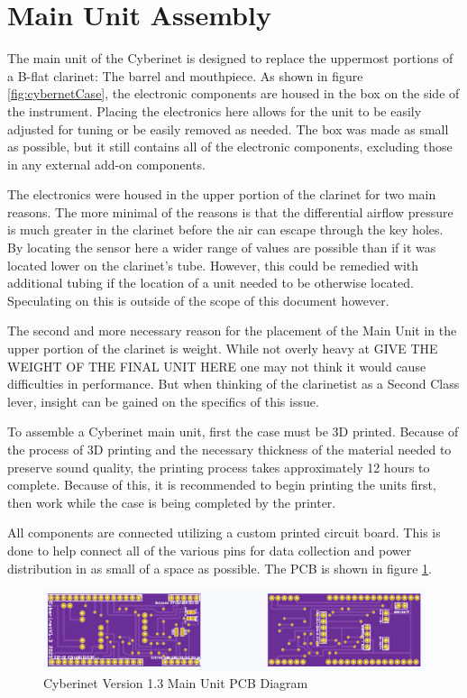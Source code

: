 \section{Main Unit Assembly}

The main unit of the Cyberinet is designed to replace the uppermost portions of a B-flat clarinet: The barrel and mouthpiece. As shown in figure \ref{fig:cybernetCase}, the electronic components are housed in the box on the side of the instrument. Placing the electronics here allows for the unit to be easily adjusted for tuning or be easily removed as needed. The box was made as small as possible, but it still contains all of the electronic components, excluding those in any external add-on components. 

The electronics were housed in the upper portion of the clarinet for two main reasons. The more minimal of the reasons is that the differential airflow pressure is much greater in the clarinet before the air can escape through the key holes. By locating the sensor here a wider range of values are possible than if it was located lower on the clarinet's tube. However, this could be remedied with additional tubing if the location of a unit needed to be otherwise located. Speculating on this is outside of the scope of this document however.

The second and more necessary reason for the placement of the Main Unit in the upper portion of the clarinet is weight. While not overly heavy at GIVE THE WEIGHT OF THE FINAL UNIT HERE one may not think it would cause difficulties in performance. But when thinking of the clarinetist as a Second Class lever, insight can be gained on the specifics of this issue. %

To assemble a Cyberinet main unit, first the case must be 3D printed. Because of the process of 3D printing and the necessary thickness of the material needed to preserve sound quality, the printing process takes approximately 12 hours to complete. Because of this, it is recommended to begin printing the units first, then work while the case is being completed by the printer.

All components are connected utilizing a custom printed circuit board. This is done to help connect all of the various pins for data collection and power distribution in as small of a space as possible. The PCB is shown in figure \ref{fig:mainUnitPCB}.

\begin{center}
    \begin{figure}
        \centering
        \includegraphics[scale=0.6]{diagrams/PCBs/cyberinetPCB.png}
        \caption{Cyberinet Version 1.3  Main Unit PCB Diagram}
        \label{fig:mainUnitPCB}
    \end{figure}
\end{center}

